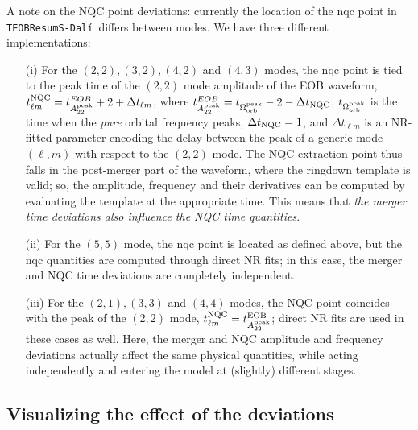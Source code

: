\documentclass[prd,amssymb,amsmath,amsfonts,nofootinbib,reprint,showpacs,longbibliography]{revtex4-1}
\def\TEOBResumSDali{\texttt{TEOBResumS-Dalí}}
\begin{document}
%
A note on the NQC point deviations: currently the location of the \ac{nqc} point in \TEOBResumSDali~differs between modes. 
We have three different implementations:
\begin{itemize}

\item[(i)] For the $(2,2), (3,2), (4,2)$ and $(4,3)$ modes, the \ac{nqc} point is tied to the peak time of the $(2,2)$
mode amplitude of the EOB waveform, $t_{\ell m}^{\rm NQC} = t_{A_{22}^{\rm peak}}^{EOB} + 2 + \Delta t_{\ell m}$, 
where $t_{A_{22}^{\rm peak}}^{EOB} = t_{\Omega_{\rm orb}^{\rm peak}} - 2 - \Delta t_{\rm NQC}$, $t_{\Omega_{\rm orb}^{\rm peak}}$
is the time when the \textit{pure} orbital frequency peaks, $\Delta t_{\rm NQC} = 1$, and $\Delta t_{\ell m}$ is an NR-fitted parameter
encoding the delay between the peak of a generic mode $(\ell, m)$ with respect to the $(2,2)$ mode.
The NQC extraction point thus falls in the post-merger part of the waveform, where the ringdown
template is valid; so, the amplitude, frequency and their derivatives can be computed by evaluating the
template at the appropriate time. This means that \textit{the merger time deviations also influence the NQC time
quantities}.
\item[(ii)] For the $(5,5)$ mode, the \ac{nqc} point is located as defined above, but the \ac{nqc} quantities
are computed through direct NR fits; in this case, the merger and NQC time deviations are completely independent.
\item[(iii)] For the $(2,1), (3,3)$ and $(4,4)$ modes, the NQC point coincides
with the peak of the $(2,2)$ mode, $t_{\ell m}^{\rm NQC} = t_{A_{22}^{\rm peak}}^{\rm EOB}$; direct NR fits 
are used in these cases as well. Here, the merger and NQC amplitude and frequency deviations actually affect
the same physical quantities, while acting independently and entering the model at (slightly) different stages.
\end{itemize}

\subsection{Visualizing the effect of the deviations}
\end{document}
